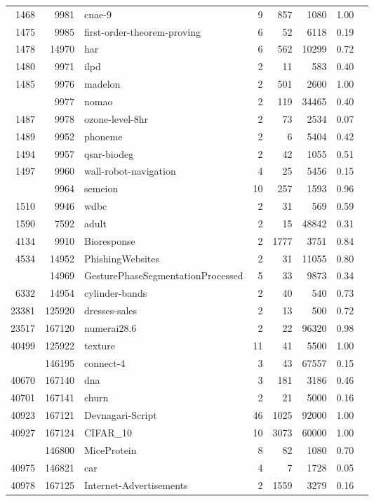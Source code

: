 \documentclass[twoside,11pt]{article}
\begin{document}
\begin{table}[h]
\begin{adjustbox}{center, width=7.75cm, totalheight=12cm}
\begin{tabular}{rrlrrrrr}
\midrule
1468 & 9981 & cnae-9 & 9 & 857 & 1080 & 1.00\\
1475 & 9985 & first-order-theorem-proving & 6 & 52 & 6118 & 0.19\\
1478 & 14970 & har & 6 & 562 & 10299 & 0.72\\
1480 & 9971 & ilpd & 2 & 11 & 583 & 0.40\\
1485 & 9976 & madelon & 2 & 501 & 2600 & 1.00\\
\addlinespace
1486 & 9977 & nomao & 2 & 119 & 34465 & 0.40\\
1487 & 9978 & ozone-level-8hr & 2 & 73 & 2534 & 0.07\\
1489 & 9952 & phoneme & 2 & 6 & 5404 & 0.42\\
1494 & 9957 & qsar-biodeg & 2 & 42 & 1055 & 0.51\\
1497 & 9960 & wall-robot-navigation & 4 & 25 & 5456 & 0.15\\
\addlinespace
1501 & 9964 & semeion & 10 & 257 & 1593 & 0.96\\
1510 & 9946 & wdbc & 2 & 31 & 569 & 0.59\\
1590 & 7592 & adult & 2 & 15 & 48842 & 0.31\\
4134 & 9910 & Bioresponse & 2 & 1777 & 3751 & 0.84\\
4534 & 14952 & PhishingWebsites & 2 & 31 & 11055 & 0.80\\
\addlinespace
4538 & 14969 & GesturePhaseSegmentationProcessed & 5 & 33 & 9873 & 0.34\\
6332 & 14954 & cylinder-bands & 2 & 40 & 540 & 0.73\\
23381 & 125920 & dresses-sales & 2 & 13 & 500 & 0.72\\
23517 & 167120 & numerai28.6 & 2 & 22 & 96320 & 0.98\\
40499 & 125922 & texture & 11 & 41 & 5500 & 1.00\\
\addlinespace
40668 & 146195 & connect-4 & 3 & 43 & 67557 & 0.15\\
40670 & 167140 & dna & 3 & 181 & 3186 & 0.46\\
40701 & 167141 & churn & 2 & 21 & 5000 & 0.16\\
40923 & 167121 & Devnagari-Script & 46 & 1025 & 92000 & 1.00\\
40927 & 167124 & CIFAR\_10 & 10 & 3073 & 60000 & 1.00\\
\addlinespace
40966 & 146800 & MiceProtein & 8 & 82 & 1080 & 0.70\\
40975 & 146821 & car & 4 & 7 & 1728 & 0.05\\
40978 & 167125 & Internet-Advertisements & 2 & 1559 & 3279 & 0.16\\

\end{tabular}
\end{adjustbox}
\end{table}
\end{document}
